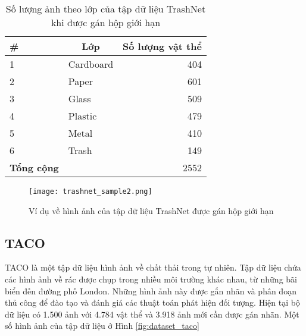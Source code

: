 \documentclass[../the.tex]{subfiles}
\begin{document}
\begin{table}[!ht]
	\centering
	\caption{Số lượng ảnh theo lớp của tập dữ liệu TrashNet khi được gán hộp giới hạn}
	\begin{tabular}{|l|l|r|}
		\hline
		\multicolumn{1}{|l|}{
			\textbf{\#}}
		 & \multicolumn{1}{c|}{\textbf{Lớp}}
		 & \multicolumn{1}{c|}{\textbf{Số lượng vật thể}} \\
		\hline

		1
		 & Cardboard
		 & 404                                            \\
		\hline

		2
		 & Paper
		 & 601                                            \\
		\hline

		3
		 & Glass
		 & 509                                            \\
		\hline

		4
		 & Plastic
		 & 479                                            \\
		\hline

		5
		 & Metal
		 & 410                                            \\
		\hline

		6
		 & Trash
		 & 149                                            \\
		\hline


		\textbf{Tổng cộng}
		 &
		 & 2552                                           \\
		\hline
	\end{tabular}

	\label{tab:dataset1}
\end{table}

\begin{figure}[H]
	\centering
	\texttt{[image: trashnet\_sample2.png]}
	\caption{Ví dụ về hình ảnh của tập dữ liệu TrashNet được gán hộp giới hạn}
	\label{fig:dataset_1}
\end{figure}

\subsection{TACO}
\label{sec:TACO}
{\fontsize{13}{12} \selectfont

	TACO là một tập dữ liệu hình ảnh về chất thải trong tự nhiên. Tập dữ liệu chứa các hình ảnh về rác được chụp trong nhiều môi trường khác nhau, từ những bãi biển đến đường phố London. Những hình ảnh này được gắn nhãn và phân đoạn thủ công để đào tạo và đánh giá các thuật toán phát hiện đối tượng.
	Hiện tại bộ dữ liệu có 1.500 ảnh với 4.784 vật thể
	và 3.918 ảnh mới cần được gán nhãn. Một số hình ảnh của tập dữ liệu ở Hình \ref{fig:dataset_taco}

}
\end{document}
